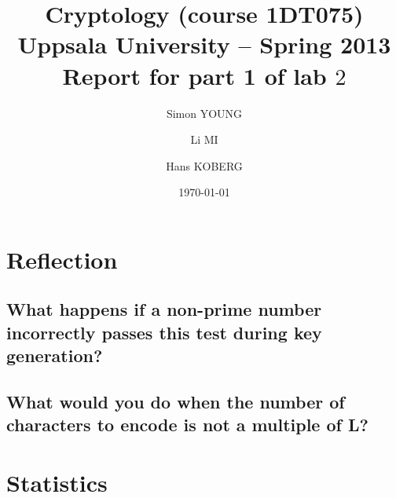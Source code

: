 \documentclass[a4paper,11pt]{article}
\title{\textbf{Cryptology (course 1DT075) \\ 
    Uppsala University -- Spring 2013 \\
    Report for part 1 of lab $2$
  }
}
\author{Simon YOUNG \and Li MI \and Hans KOBERG} %
\date{\today}
\begin{document}
\maketitle

\section{Reflection}

\subsection{What happens if a non-prime number incorrectly passes this test during key generation?}

\subsection{What would you do when the number of characters to encode is not a multiple of L?}

\section{Statistics}
\end{document}
